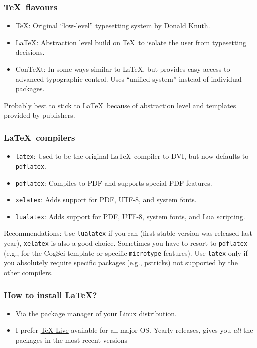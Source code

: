 \documentclass[aspectratio=1610,hyperref={colorlinks,linkcolor=}]{beamer}
\begin{document}
\begin{frame}
    \frametitle{\TeX\ flavours}
    \begin{itemize}
        \item \TeX\@: Original ``low-level'' typesetting system by Donald Knuth.
        \item \LaTeX\@: Abstraction level build on \TeX\ to isolate the user from typesetting decisions.
        \item ConTeXt\@: In some ways similar to \LaTeX, but provides easy access to advanced typographic control. Uses ``unified system'' instead of individual packages.
    \end{itemize}
    Probably best to stick to \LaTeX\ because of abstraction level and templates provided by publishers.
\end{frame}

\begin{frame}
    \frametitle{\LaTeX\ compilers}
    \begin{itemize}
        \item \texttt{latex}: Used to be the original \LaTeX\ compiler to DVI\@, but now defaults to \texttt{pdflatex}.
        \item \texttt{pdflatex}: Compiles to PDF and supports special PDF features.
        \item \texttt{xelatex}: Adds support for PDF, UTF-8, and system fonts.
        \item \texttt{lualatex}: Adds support for PDF, UTF-8, system fonts, and Lua scripting.
    \end{itemize}
    Recommendations: Use \texttt{lualatex} if you can (first stable version was released last year), \texttt{xelatex} is also a good choice. Sometimes you have to resort to \texttt{pdflatex} (e.g., for the CogSci template or specific \texttt{microtype} features).  Use \texttt{latex} only if you absolutely require specific packages (e.g., pstricks) not supported by the other compilers.
\end{frame}

\begin{frame}
    \frametitle{How to install \LaTeX?}
    \begin{itemize}
        \item Via the package manager of your Linux distribution.
        \item I prefer \href{https://www.tug.org/texlive/}{TeX Live} available for all major OS\@.  Yearly releases, gives you \emph{all} the packages in the most recent versions.
    \end{itemize}
\end{frame}
\end{document}
